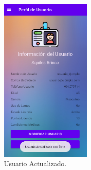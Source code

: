 \documentclass[a4paper,10pt, oneside, titlepage]{article}
\begin{document}
	\begin{figure}[!ht]
		\centering
		\includegraphics[width = 0.4\linewidth, height = 8.3cm]{43.png}
		\caption{Usuario Actualizado.}
	\end{figure}
\end{document}
